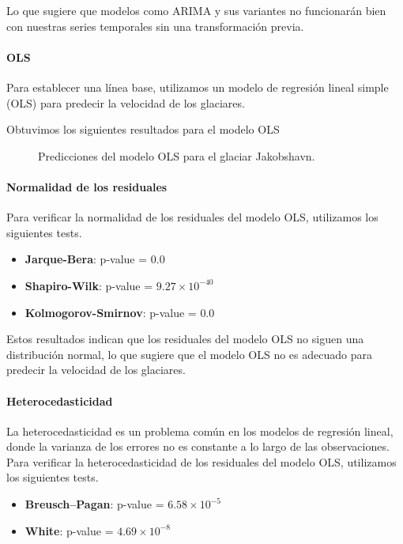 \documentclass[sigconf,authordraft,language=spanish]{acmart}
\begin{document}
Lo que sugiere que modelos como ARIMA y sus variantes no funcionarán bien con nuestras series temporales sin una transformación previa.

\paragraph{OLS}

Para establecer una línea base, utilizamos un modelo de regresión lineal simple (OLS) para predecir la velocidad de los glaciares.

Obtuvimos los siguientes resultados para el modelo OLS

\begin{figure}[htbp]
   \centering
   
    \caption{Predicciones del modelo OLS para el glaciar Jakobshavn.}
    \label{fig:jakobshavn_ols}
\end{figure}

\paragraph{Normalidad de los residuales}

Para verificar la normalidad de los residuales del modelo OLS, utilizamos los siguientes tests.
\begin{itemize}
  \item \textbf{Jarque-Bera}: p-value = $0.0$
  \item \textbf{Shapiro-Wilk}: p-value = $9.27 \times 10^{-40}$
  \item \textbf{Kolmogorov-Smirnov}: p-value = $0.0$
\end{itemize}

Estos resultados indican que los residuales del modelo OLS no siguen una distribución normal, lo que sugiere que el modelo OLS no es adecuado para predecir la velocidad de los glaciares.

\paragraph{Heterocedasticidad}

La heterocedasticidad es un problema común en los modelos de regresión lineal, donde la varianza de los errores no es constante a lo largo de las observaciones.
Para verificar la heterocedasticidad de los residuales del modelo OLS, utilizamos los siguientes tests.

\begin{itemize}
  \item \textbf{Breusch–Pagan}: p-value = $6.58 \times 10^{-5}$
  \item \textbf{White}: p-value = $4.69 \times 10^{-8}$
\end{itemize}
\end{document}
